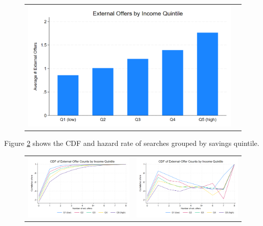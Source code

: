 \documentclass[12pt]{article}
\begin{document}
\begin{figure}[H]
\caption{}
\label{fig:ie3_3}
\centering{}%
\begin{tabular}{cc}
\includegraphics[scale=0.27]{figures/IE3_search_by_income_quintile.png}
\end{tabular}
\end{figure}

Figure \ref{fig:ie3_4} shows the CDF and hazard rate of searches grouped by savings quintile. 

\begin{figure}[H] 
\caption{}
\label{fig:ie3_4}
\centering{}%
\begin{tabular}{cc}
\includegraphics[scale=0.26]{figures/IE3_search_CDF_by_income_quintile.png} & \includegraphics[scale=0.26]{figures/IE3_search_hazardrate_by_income_quintile.png}
\end{tabular}
\end{figure}
\end{document}
